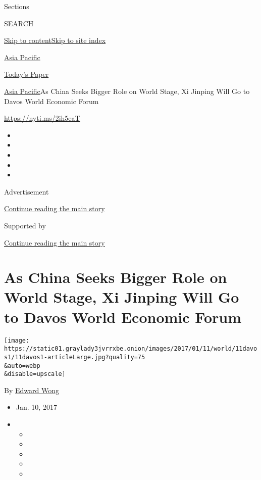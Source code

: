 Sections

SEARCH

\protect\hyperlink{site-content}{Skip to
content}\protect\hyperlink{site-index}{Skip to site index}

\href{https://www.nytimes3xbfgragh.onion/section/world/asia}{Asia
Pacific}

\href{https://myaccount.nytimes3xbfgragh.onion/auth/login?response_type=cookie\&client_id=vi}{}

\href{https://www.nytimes3xbfgragh.onion/section/todayspaper}{Today's
Paper}

\href{/section/world/asia}{Asia Pacific}\textbar{}As China Seeks Bigger
Role on World Stage, Xi Jinping Will Go to Davos World Economic Forum

\url{https://nyti.ms/2ih5eaT}

\begin{itemize}
\item
\item
\item
\item
\item
\end{itemize}

Advertisement

\protect\hyperlink{after-top}{Continue reading the main story}

Supported by

\protect\hyperlink{after-sponsor}{Continue reading the main story}

\hypertarget{as-china-seeks-bigger-role-on-world-stage-xi-jinping-will-go-to-davos-world-economic-forum}{%
\section{As China Seeks Bigger Role on World Stage, Xi Jinping Will Go
to Davos World Economic
Forum}\label{as-china-seeks-bigger-role-on-world-stage-xi-jinping-will-go-to-davos-world-economic-forum}}

\texttt{[image: https://static01.graylady3jvrrxbe.onion/images/2017/01/11/world/11davos1/11davos1-articleLarge.jpg?quality=75\\\&auto=webp\\\&disable=upscale]}

By \href{http://www.nytimes3xbfgragh.onion/by/edward-wong}{Edward Wong}

\begin{itemize}
\item
  Jan. 10, 2017
\item
  \begin{itemize}
  \item
  \item
  \item
  \item
  \item
  \end{itemize}
\end{itemize}

